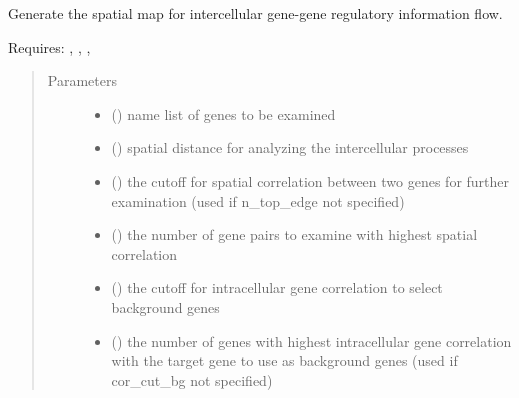 \documentclass[letterpaper,10pt,english]{sphinxmanual}
\begin{document}
\begin{fulllineitems}
\begin{fulllineitems}
\end{fulllineitems}


\begin{fulllineitems}
\label{\detokenize{api:spaotsc.SpaOTsc.spatial_sc.spatial_grn_range}}
Generate the spatial map for intercellular gene-gene regulatory information flow.

Requires: , , , 
\begin{quote}\begin{description}
\item[{Parameters}] \leavevmode\begin{itemize}
\item {} 
 () \textendash{} name list of genes to be examined

\item {} 
 () \textendash{} spatial distance for analyzing the intercellular processes

\item {} 
 () \textendash{} the cutoff for spatial correlation between two genes for further examination (used if n\_top\_edge not specified)

\item {} 
 () \textendash{} the number of gene pairs to examine with highest spatial correlation

\item {} 
 () \textendash{} the cutoff for intracellular gene correlation to select background genes

\item {} 
 () \textendash{} the number of genes with highest intracellular gene correlation with the target gene to use as background genes (used if cor\_cut\_bg not specified)


\end{itemize}
\end{description}
\end{quote}
\end{fulllineitems}
\end{fulllineitems}
\end{document}

